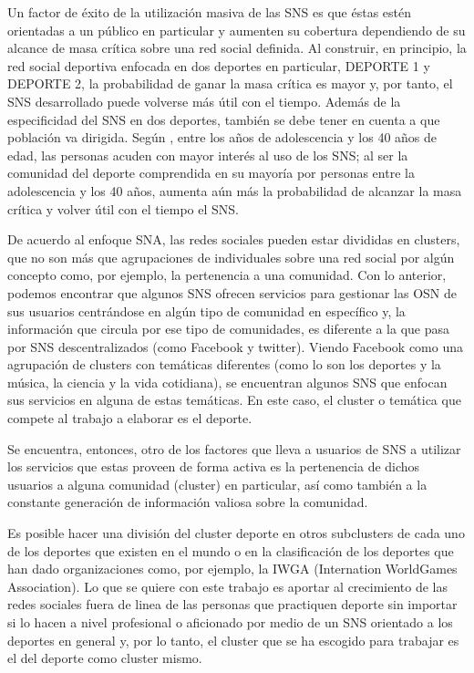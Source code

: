Un factor de éxito de la utilización masiva de las SNS es que éstas estén orientadas a un público en particular y aumenten su cobertura dependiendo de su alcance de masa crítica sobre una red social definida\cite[pag. PENDIENTE]{sna_startups}. Al construir, en principio, la red social deportiva enfocada en dos deportes en particular, DEPORTE 1 y DEPORTE 2, la probabilidad de ganar la masa crítica es mayor y, por tanto, el SNS desarrollado puede volverse más útil con el tiempo. Además de la especificidad del SNS en dos deportes, también se debe tener en cuenta a que población va dirigida. Según \cite{user_behavior_online}, entre los años de adolescencia y los 40 años de edad, las personas acuden con mayor interés al uso de los SNS; al ser la comunidad del deporte comprendida en su mayoría por personas entre la adolescencia y los 40 años, aumenta aún más la probabilidad de alcanzar la masa crítica y volver útil con el tiempo el SNS.

De acuerdo al enfoque SNA, las redes sociales pueden estar divididas en clusters, que no son más que agrupaciones de individuales sobre una red social por algún concepto como, por ejemplo, la pertenencia a una comunidad. Con lo anterior, podemos encontrar que algunos SNS ofrecen servicios para gestionar las OSN de sus usuarios centrándose en algún tipo de comunidad en específico y, la información que circula por ese tipo de comunidades, es diferente a la que pasa por SNS descentralizados (como Facebook y twitter). Viendo Facebook como una agrupación de clusters con temáticas diferentes (como lo son los deportes y la música, la ciencia y la vida cotidiana), se encuentran algunos SNS que enfocan sus servicios en alguna de estas temáticas. En este caso, el cluster o temática que compete al trabajo a elaborar es el deporte.

Se encuentra, entonces, otro de los factores que lleva a usuarios de SNS a utilizar los servicios que estas proveen de forma activa es la pertenencia de dichos usuarios a alguna comunidad (cluster) en particular\cite[pag.3]{dynamics}, así como también a la constante generación de información valiosa sobre la comunidad. 

Es posible hacer una división del cluster deporte en otros subclusters de cada uno de los deportes que existen en el mundo o en la clasificación de los deportes que han dado organizaciones como, por ejemplo, la IWGA (Internation WorldGames Association). Lo que se quiere con este trabajo es aportar al crecimiento de las redes sociales fuera de linea de las personas que practiquen deporte sin importar si lo hacen a nivel profesional o aficionado por medio de un SNS orientado a los deportes en general y, por lo tanto, el cluster que se ha escogido para trabajar es el del deporte como cluster mismo.

